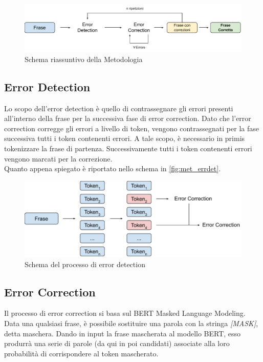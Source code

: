 \begin{figure}[H]
\centering
\includegraphics[width=\textwidth]{immagini/metodologia/generale}
\caption{Schema riassuntivo della Metodologia}
\label{fig:met_generale}
\end{figure}


\subsection{Error Detection}
\label{sec:met_errdet}

Lo scopo dell'error detection è quello di contrassegnare gli errori presenti all'interno della frase per la successiva fase di error correction. Dato che l'error correction corregge gli errori a livello di token, vengono contrassegnati per la fase successiva tutti i token contenenti errori. A tale scopo, è necessario in primis tokenizzare la frase di partenza. Successivamente tutti i token contenenti errori vengono marcati per la correzione.\\
Quanto appena spiegato è riportato nello schema in \autoref{fig:met_errdet}.

\begin{figure}[H]
\centering
\includegraphics[width=\textwidth]{immagini/metodologia/error_detection}
\caption{Schema del processo di error detection}
\label{fig:met_errdet}
\end{figure}

\subsection{Error Correction}
\label{sec:met_errcor}

Il processo di error correction si basa sul BERT Masked Language Modeling. Data una qualsiasi frase, è possibile sostituire una parola con la stringa \textit{[MASK]}, detta maschera. Dando in input la frase mascherata al modello BERT, esso produrrà una serie di parole (da qui in poi candidati) associate alla loro probabilità di corrispondere al token mascherato.

